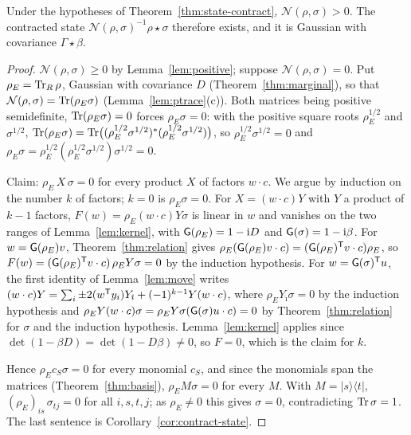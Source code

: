 \begin{theorem}\label{thm:normalization}
Under the hypotheses of Theorem~\ref{thm:state-contract}, $\mathcal N(\rho,\sigma)>0$. The
contracted state
$\mathcal N(\rho,\sigma)^{-1}\rho\star\sigma$ therefore exists, and it is Gaussian with
covariance $\Gamma\star\beta$.
\end{theorem}
\begin{proof}
$\mathcal N(\rho,\sigma)\geq0$ by Lemma~\ref{lem:positive}; suppose $\mathcal N(\rho,\sigma)=0$. Put
$\rho_E=\operatorname{Tr}_{R}\rho$, Gaussian with covariance $D$ (Theorem~\ref{thm:marginal}), so that
$\mathcal N(\rho,\sigma)=\operatorname{Tr}(\rho_E\sigma)$ (Lemma~\ref{lem:ptrace}(c)). Both matrices being positive
semidefinite, $\operatorname{Tr}(\rho_E\sigma)=0$ forces $\rho_E\sigma=0$: with the positive square roots
$\rho_E^{1/2}$ and $\sigma^{1/2}$,
$\operatorname{Tr}(\rho_E\sigma)=\operatorname{Tr}\bigl((\rho_E^{1/2}\sigma^{1/2})^*(\rho_E^{1/2}\sigma^{1/2})\bigr)$, so
$\rho_E^{1/2}\sigma^{1/2}=0$ and $\rho_E\sigma=\rho_E^{1/2}(\rho_E^{1/2}\sigma^{1/2})\sigma^{1/2}=0$.

Claim: $\rho_E\,X\,\sigma=0$ for every product $X$ of factors $w\cdot c$. We argue by induction on the
number $k$ of factors; $k=0$ is $\rho_E\sigma=0$. For $X=(w\cdot c)Y$ with $Y$ a product of $k-1$
factors, $F(w)=\rho_E(w\cdot c)Y\sigma$ is linear in $w$ and vanishes on the two ranges of
Lemma~\ref{lem:kernel}, with $\mathsf G(\rho_E)=1-\mathrm i D$ and $\mathsf G(\sigma)=1-\mathrm i\beta$. For $w=\mathsf G(\rho_E)v$,
Theorem~\ref{thm:relation} gives $\rho_E(\mathsf G(\rho_E)v\cdot c)=(\mathsf G(\rho_E)^{\mathsf T}v\cdot c)\rho_E$, so
$F(w)=(\mathsf G(\rho_E)^{\mathsf T}v\cdot c)\,\rho_EY\sigma=0$ by the induction hypothesis. For
$w=\mathsf G(\sigma)^{\mathsf T}u$, the first identity of Lemma~\ref{lem:move} writes
$(w\cdot c)Y=\sum_i\pm2(w^{\mathsf T}y_i)Y_{\hat\imath}+(-1)^{k-1}Y(w\cdot c)$, where
$\rho_EY_{\hat\imath}\sigma=0$ by the induction hypothesis and
$\rho_EY(w\cdot c)\sigma=\rho_EY\sigma(\mathsf G(\sigma)u\cdot c)=0$ by Theorem~\ref{thm:relation} for
$\sigma$ and the induction hypothesis. Lemma~\ref{lem:kernel} applies since
$\det(1-\beta D)=\det(1-D\beta)\neq0$, so $F=0$, which is the claim for $k$.

Hence $\rho_Ec_S\sigma=0$ for every monomial $c_S$, and since the monomials span the matrices
(Theorem~\ref{thm:basis}), $\rho_EM\sigma=0$ for every $M$. With $M=|s\rangle\langle t|$,
$(\rho_E)_{is}\,\sigma_{tj}=0$ for all $i,s,t,j$; as $\rho_E\neq0$ this gives $\sigma=0$,
contradicting $\operatorname{Tr}\sigma=1$. The last sentence is Corollary~\ref{cor:contract-state}.
\end{proof}
